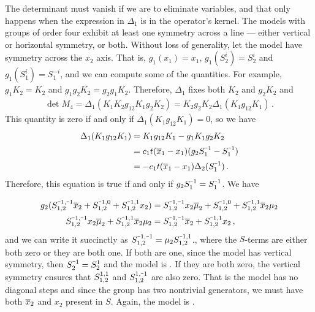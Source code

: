 
The determinant must vanish if we are to eliminate variables, and that only happens when the expression in $\Delta_1$ is in the operator's kernel. The models with groups of order four exhibit at least one symmetry across a line --- either vertical or horizontal symmetry, or both. Without loss of generality, let the model have symmetry across the $x_2$ axis. That is, $g_1(x_1) = x_1$, $g_1(S_2^i) = S_2^i$ and $g_1(S_1^i) = S_1^{-i}$, and we can compute some of the quantities. For example, $g_1 K_2 = K_2$ and $g_1g_2K_2 = g_2 g_1 K_2$. Therefore, $\Delta_1$ fixes both $K_2$ and $g_2K_2$ and
\begin{align}
	\det M_4 = \Delta_1  (K_1K_2 g_{12}K_1 g_2K_2) = K_2 g_2K_2 \Delta_1  (K_1 g_{12}K_1)\,.
\end{align}
This quantity is zero if and only if $\Delta_1  (K_1 g_{12}K_1) = 0$, so we have
\begin{align}
	\begin{split}
		\Delta_1  (K_1 g_{12}K_1) &= K_1g_{12}K_1 - g_1 K_1 g_2 K_2 \\
		&= c_1 t (\ol x_1-x_1)(g_2 S_1^{\um 1}-S_1^{\um 1})\\
		& = -c_1 t(\ol x_1-x_1)\Delta_2(S_1^{\um 1})\,.
	\end{split}
\end{align}
Therefore, this equation is true if and only if $g_2 S_1^{\um 1} = S_1^{\um 1}$. We have

\begin{align}
\begin{split}
		g_2 (\Sf{\um 1, \um 1}\ol x_2 + \Sf{\um 1,0} + \Sf{\um 1,1}x_2) &= \Sf{\um 1, \um 1}x_2 \ol \mu_2 + \Sf{\um 1,0} + \Sf{\um 1,1}\ol x_2\mu_2\\
		\Sf{\um 1, \um 1}x_2 \ol \mu_2 + \Sf{\um 1,1}\ol x_2\mu_2 &= \Sf{\um 1, \um 1}\ol x_2 + \Sf{\um 1,1}x_2\,,
\end{split}
\end{align}
and we can write it succinctly as $\Sf{\um 1, \um 1} = \mu_2 \Sf{\um 1,1}$., where the $S$-terms are either both zero or they are both one. If both are one, since the model has vertical symmetry, then $S_2^{\um 1} = S_2^1$ and the model is \highSym. If they are both zero, the vertical symmetry ensures that $S_{1,2}^{1,1}$ and $\Sf{1,\um 1}$ are also zero. That is the model has no diagonal steps and since the group has two nontrivial generators, we must have both $\overline{x}_2$ and $x_2$ present in $S$. Again, the model is \highSym.

